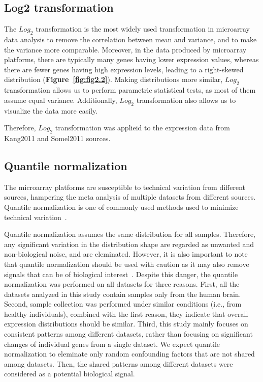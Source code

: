 \subsection{Log2 transformation}

The $Log_2$ transformation is the most widely used transformation in microarray data analysis
to remove the correlation between mean and variance, and to make the variance more comparable.
Moreover, in the data produced by microarray platforms, there are typically many genes having lower expression values, 
whereas there are fewer genes having high expression levels,
leading to a right-skewed distribution (\textbf{Figure~\ref{fig:fig2.2}}).
Making distributions more similar, $Log_2$ transformation allows us to perform parametric statistical tests, as most of them assume equal variance. 
Additionally, $Log_2$ transformation also allows us to visualize the data more easily.

Therefore, $Log_2$ transformation was applieid to the expression data from Kang2011 and Somel2011 sources.

\subsection{Quantile normalization}
The microarray platforms are susceptible to technical variation from different sources, hampering the meta analysis of multiple datasets from different sources.
Quantile normalization is one of commonly used methods used to minimize technical variation~\cite{Zhao2020}. 

Quantile normalization assumes the same distribution for all samples. 
Therefore, any significant variation in the distribution shape are regarded as unwanted and non-biological noise, and are eleminated.
However, it is also important to note that quantile normalization should be used with caution as it may also remove signals that can be of biological interest~\cite{Hicks2014}.
Despite this danger, the quantile normalization was performed on all datasets for three reasons. 
First, all the datasets analyzed in this study contain samples only from the human brain.
Second, sample collection was performed under similar conditions (i.e., from healthy individuals), combined with the first reason, they indicate that overall expression distributions should be similar.
Third, this study mainly focuses on consistent patterns among different datasets, rather than focusing on significant changes of individual genes from a single dataset.
We expect quantile normalization to eleminate only random confounding factors that are not shared among datasets. 
Then, the shared patterns among different datasets were considered as a potential biological signal.

